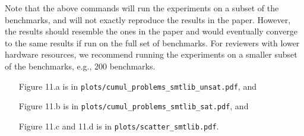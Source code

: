 \documentclass[acmlarge, nonacm]{acmart}
\begin{document}
Note that the above commands will run the experiments on a subset of the benchmarks, and will not exactly reproduce the results in the paper. However, the results should resemble the ones in the paper and would eventually converge to the same results if run on the full set of benchmarks. For reviewers with lower hardware resources, we recommend running the experiments on a smaller subset of the benchmarks, e.g., 200 benchmarks.

\begin{itemize}
  \item[Figure 11.a] is in \texttt{plots/cumul\_problems\_smtlib\_unsat.pdf}, and
  \item[Figure 11.b] is in \texttt{plots/cumul\_problems\_smtlib\_sat.pdf}, and
  \item[Figure 11.c and 11.d] is in \texttt{plots/scatter\_smtlib.pdf}.
\end{itemize}
\end{document}

